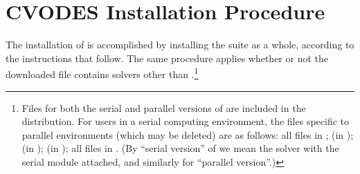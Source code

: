 \chapter{CVODES Installation Procedure}\label{c:install}

The installation of {\cvodes} is accomplished by installing the
{\sundials} suite as a whole, according to the instructions that
follow.   The same procedure applies whether or not the downloaded
file contains solvers other than {\cvodes}.\footnote{Files for both the
serial and parallel versions of {\cvodes} are included in the distribution.
For users in a serial computing environment, the files specific to parallel
environments (which may be deleted) are as follows:
all files in ;
 (in );
 (in );
 (in ); 
all files in .
(By ``serial version'' of {\cvodes} we mean the {\cvodes} solver with the
serial {\nvector} module attached, and similarly for ``parallel version''.)}

